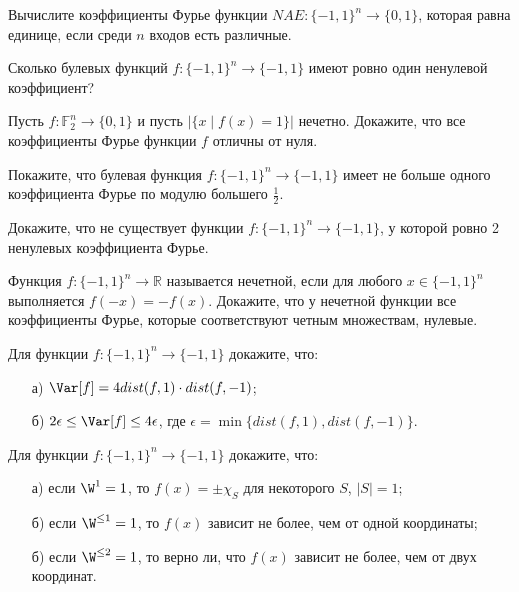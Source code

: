 \begin{task}
    Вычислите коэффициенты Фурье функции $NAE: \{-1, 1\}^n \to \{0, 1\}$, которая равна единице, если среди $n$ входов есть
    различные.
\end{task}


\begin{task}
    Сколько булевых функций $f: \{-1, 1\}^n \to \{-1, 1\}$ имеют ровно один ненулевой коэффициент?
\end{task}

\begin{task}
    Пусть $f: \mathbb{F}_2^n \to \{0, 1\}$ и пусть $|\{x \mid f(x) = 1\}|$ нечетно. Докажите, что все коэффициенты Фурье функции
    $f$ отличны от нуля.
\end{task}


\begin{task}
    Покажите, что булевая функция $f: \{-1, 1\}^n \to \{-1, 1\}$ имеет не больше одного коэффициента Фурье по модулю большего
    $\frac{1}{2}$.
\end{task}


\begin{task}
    Докажите, что не существует функции $f: \{-1, 1\}^n \to \{-1, 1\}$, у которой ровно 2 ненулевых коэффициента Фурье.
\end{task}


\begin{task}
    Функция $f: \{-1, 1\}^n \to \mathbb{R}$ называется нечетной, если для любого $x \in \{-1, 1\}^n$ выполняется $f(-x) =
    -f(x)$. Докажите, что у нечетной функции все коэффициенты Фурье, которые соответствуют четным множествам, нулевые.
\end{task}

\begin{task}
    Для функции $f: \{-1, 1\}^n \to \{-1, 1\}$ докажите, что:
	\begin{enumerate}[topsep = 0pt, itemsep = -1ex]
        \item [а)] $\Var[f] = 4 dist(f, 1) \cdot dist(f, -1)$;
        \item [б)] $2 \epsilon \le \Var[f] \le 4 \epsilon$, где $\epsilon = \min \{dist(f, 1), dist(f, -1)\}$.
	\end{enumerate}
\end{task}


\begin{task}
    Для функции $f: \{-1, 1\}^n \to \{-1, 1\}$ докажите, что:
   	\begin{enumerate}[topsep = 0pt, itemsep = -1ex]
        \item [а)] если $\W^{1} = 1$, то $f(x) = \pm \chi_{S}$ для некоторого $S$, $|S| = 1$;
        \item [б)] если $\W^{\le 1} = 1$, то $f(x)$ зависит не более, чем от одной координаты;
        \item [б)] если $\W^{\le 2} = 1$, то верно ли, что $f(x)$ зависит не более, чем от двух координат.
	\end{enumerate}
\end{task}


